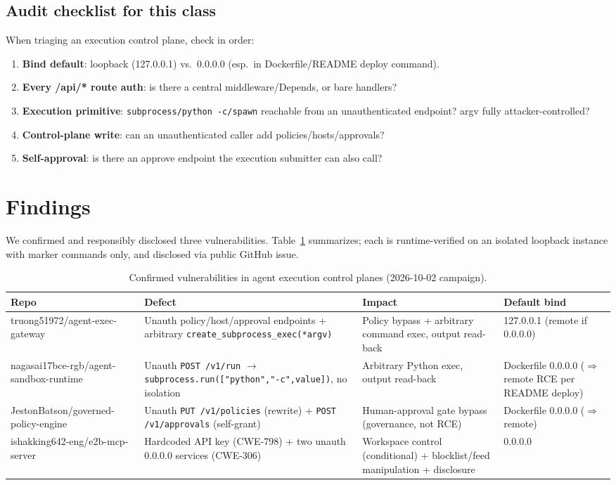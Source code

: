 \documentclass{llncs}
\begin{document}
\subsection{Audit checklist for this class}\label{sub:checklist}
When triaging an execution control plane, check in order:
\begin{enumerate}
    \item \textbf{Bind default}: loopback (127.0.0.1) vs.\ 0.0.0.0 (esp.\ in Dockerfile/README deploy command).
    \item \textbf{Every /api/* route auth}: is there a central middleware/Depends, or bare handlers?
    \item \textbf{Execution primitive}: \texttt{subprocess/python -c/spawn} reachable from an unauthenticated endpoint? argv fully attacker-controlled?
    \item \textbf{Control-plane write}: can an unauthenticated caller add policies/hosts/approvals?
    \item \textbf{Self-approval}: is there an approve endpoint the execution submitter can also call?
\end{enumerate}

\section{Findings}\label{sec:findings}

We confirmed and responsibly disclosed three vulnerabilities. Table~\ref{tab:findings} summarizes; each is runtime-verified on an isolated loopback instance with marker commands only, and disclosed via public GitHub issue.

\begin{table}[ht]
\centering\small
\caption{Confirmed vulnerabilities in agent execution control planes (2026-10-02 campaign).}
\label{tab:findings}
\begin{tabular}{@{}llll@{}}
\toprule
\textbf{Repo} & \textbf{Defect} & \textbf{Impact} & \textbf{Default bind} \\
\midrule
truong51972/agent-exec-gateway & Unauth policy/host/approval endpoints + arbitrary \texttt{create\_subprocess\_exec(*argv)} & Policy bypass + arbitrary command exec, output read-back & 127.0.0.1 (remote if 0.0.0.0) \\
nagasai17bce-rgb/agent-sandbox-runtime & Unauth \texttt{POST /v1/run} $\to$ \texttt{subprocess.run(["python","-c",value])}, no isolation & Arbitrary Python exec, output read-back & Dockerfile 0.0.0.0 ($\Rightarrow$ remote RCE per README deploy) \\
JestonBatson/governed-policy-engine & Unauth \texttt{PUT /v1/policies} (rewrite) + \texttt{POST /v1/approvals} (self-grant) & Human-approval gate bypass (governance, not RCE) & Dockerfile 0.0.0.0 ($\Rightarrow$ remote) \\
ishakking642-eng/e2b-mcp-server & Hardcoded API key (CWE-798) + two unauth 0.0.0.0 services (CWE-306) & Workspace control (conditional) + blocklist/feed manipulation + disclosure & 0.0.0.0 \\
\bottomrule
\end{tabular}
\end{table}
\end{document}
